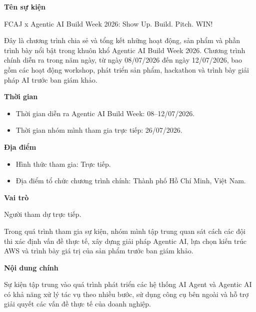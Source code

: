 \vspace{0.5em}\noindent\textbf{Tên sự kiện}\par

FCAJ x Agentic AI Build Week 2026: Show Up. Build. Pitch. WIN!

Đây là chương trình chia sẻ và tổng kết những hoạt động, sản phẩm và
phần trình bày nổi bật trong khuôn khổ Agentic AI Build Week 2026.
Chương trình chính diễn ra trong năm ngày, từ ngày 08/07/2026 đến ngày
12/07/2026, bao gồm các hoạt động workshop, phát triển sản phẩm,
hackathon và trình bày giải pháp AI trước ban giám khảo.

\vspace{0.5em}\noindent\textbf{Thời gian}\par

\begin{itemize}
\tightlist
\item
  Thời gian diễn ra Agentic AI Build Week: 08--12/07/2026.
\item
  Thời gian nhóm mình tham gia trực tiếp: 26/07/2026.
\end{itemize}

\vspace{0.5em}\noindent\textbf{Địa điểm}\par

\begin{itemize}
\tightlist
\item
  Hình thức tham gia: Trực tiếp.
\item
  Địa điểm tổ chức chương trình chính: Thành phố Hồ Chí Minh, Việt Nam.
\end{itemize}

\vspace{0.5em}\noindent\textbf{Vai trò}\par

Người tham dự trực tiếp.

Trong quá trình tham gia sự kiện, nhóm mình tập trung quan sát cách các
đội thi xác định vấn đề thực tế, xây dựng giải pháp Agentic AI, lựa chọn
kiến trúc AWS và trình bày giá trị của sản phẩm trước ban giám khảo.

\vspace{0.5em}\noindent\textbf{Nội dung chính}\par

Sự kiện tập trung vào quá trình phát triển các hệ thống AI Agent và
Agentic AI có khả năng xử lý tác vụ theo nhiều bước, sử dụng công cụ bên
ngoài và hỗ trợ giải quyết các vấn đề thực tế của doanh nghiệp.

